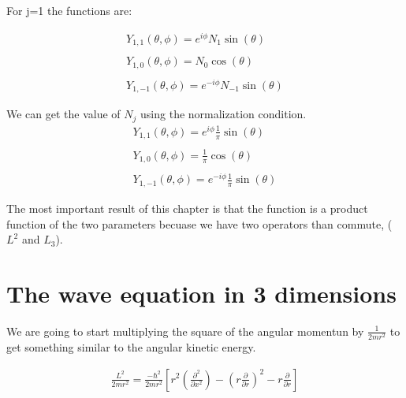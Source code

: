 For j=1 the functions are:

\begin{equation}
  \begin{array}{c}
    Y_{1,1}(\theta,\phi) = e^{i\phi} N_1 \sin(\theta)
    \\

    \\
    Y_{1,0}(\theta,\phi) = N_0 \cos(\theta)
    \\

    \\
    Y_{1,-1}(\theta,\phi) = e^{-i\phi} N_{-1} \sin(\theta)
  \end{array}
\end{equation}


We can get the value of $N_j$ using the normalization condition.
\begin{equation}
  \begin{array}{c}
    Y_{1,1}(\theta,\phi) = e^{i\phi} \frac{1}{\pi} \sin(\theta)
    \\

    \\
    Y_{1,0}(\theta,\phi) = \frac{1}{\pi} \cos(\theta)
    \\

    \\
    Y_{1,-1}(\theta,\phi) = e^{-i\phi} \frac{1}{\pi} \sin(\theta)
  \end{array}
\end{equation}



The most important result of this chapter is that the function is a product function of the two parameters becuase we have two operators than commute, ($L^2$ and $L_3$).

\section{The wave equation in 3 dimensions}

We are going to start multiplying the square of the angular momentun by $\frac{1}{2mr^2}$ to get something similar to the angular kinetic energy.

\begin{equation}
  \begin{array}{c}
    \frac{L^2}{2mr^2} = \frac{-\hbar^2}{2mr^2}\left[r^2\left(\frac{\partial^2}{\partial x^2}\right)-\left(r\frac{\partial}{\partial r}\right)^2-r\frac{\partial}{\partial r}\right]
  \end{array}
\end{equation}

